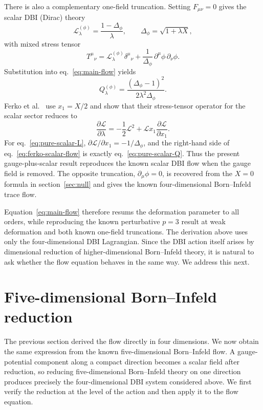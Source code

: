 \documentclass[a4paper,11pt]{article}
\numberwithin{equation}{section}
\newcommand{\Lag}{\mathcal L}
\begin{document}
There is also a complementary one-field truncation. Setting $F_{\mu\nu}=0$ gives the scalar DBI (Dirac) theory
\begin{equation}
 \Lag_\lambda^{(\phi)}=\frac{1-\Delta_\phi}{\lambda},
 \qquad
 \Delta_\phi=\sqrt{1+\lambda X},
 \label{eq:pure-scalar-L}
\end{equation}
with mixed stress tensor
\begin{equation}
 T^\mu{}_{\nu}=\Lag_\lambda^{(\phi)}\delta^\mu{}_{\nu}
 +\frac{1}{\Delta_\phi}\,\partial^\mu\phi\,\partial_\nu\phi.
 \label{eq:pure-scalar-T}
\end{equation}
Substitution into eq.~\eqref{eq:main-flow} yields
\begin{equation}
 Q_\lambda^{(\phi)}
 =\frac{(\Delta_\phi-1)^2}{2\lambda^2\Delta_\phi}.
 \label{eq:pure-scalar-Q}
\end{equation}
Ferko et al.~\cite{Ferko2024DBI} use $x_1=X/2$ and show that their stress-tensor operator for the scalar sector reduces to
\begin{equation}
 \frac{\partial\Lag}{\partial\lambda}
 =-\frac12\Lag^2+\Lag x_1\frac{\partial\Lag}{\partial x_1}.
 \label{eq:ferko-scalar-flow}
\end{equation}
For eq.~\eqref{eq:pure-scalar-L}, $\partial\Lag/\partial x_1=-1/\Delta_\phi$, and the right-hand side of eq.~\eqref{eq:ferko-scalar-flow} is exactly eq.~\eqref{eq:pure-scalar-Q}. Thus the present gauge-plus-scalar result reproduces the known scalar DBI flow when the gauge field is removed. The opposite truncation, $\partial_\mu\phi=0$, is recovered from the $X=0$ formula in section~\ref{sec:null} and gives the known four-dimensional Born--Infeld trace flow.

Equation~\eqref{eq:main-flow} therefore resums the deformation parameter to all orders, while reproducing the known perturbative $p=3$ result at weak deformation and both known one-field truncations. The derivation above uses only the four-dimensional DBI Lagrangian. Since the DBI action itself arises by dimensional reduction of higher-dimensional Born--Infeld theory, it is natural to ask whether the flow equation behaves in the same way. We address this next.

\section{Five-dimensional Born--Infeld reduction}
\label{sec:reduction}

The previous section derived the flow directly in four dimensions. We now obtain the same expression from the known five-dimensional Born--Infeld flow. A gauge-potential component along a compact direction becomes a scalar field after reduction, so reducing five-dimensional Born--Infeld theory on one direction produces precisely the four-dimensional DBI system considered above. We first verify the reduction at the level of the action and then apply it to the flow equation.
\end{document}
